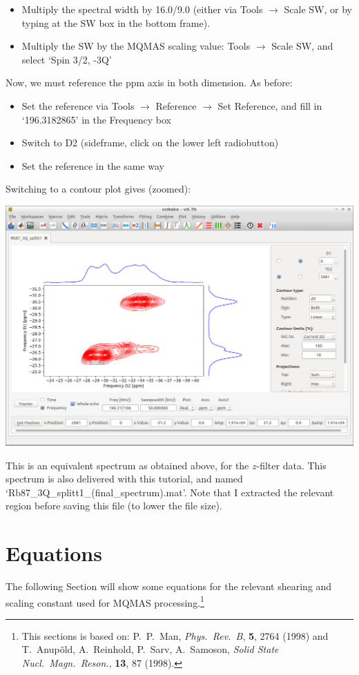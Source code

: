 \documentclass[11pt,a4paper]{article}
\begin{document}
\begin{itemize}
	\item Multiply the spectral width by 16.0/9.0 (either via Tools  $\longrightarrow$ Scale SW, or
	  by typing at the SW box in the bottom frame).
	\item Multiply the SW by the MQMAS scaling value: Tools  $\longrightarrow$ Scale SW, and select `Spin 3/2, -3Q'
\end{itemize}
Now, we must reference the ppm axis in both dimension. As before:
\begin{itemize}
  \item Set the reference via Tools $\longrightarrow$ Reference $\longrightarrow$ Set Reference, and
	 fill in `196.3182865' in the Frequency box
	\item Switch to D2 (sideframe, click on the lower left radiobutton)
	\item Set the reference in the same way
\end{itemize}
Switching to a contour plot gives (zoomed):
\begin{center}
\includegraphics[width=0.8\linewidth]{Figs/Fig11.png}
\end{center}
This is an equivalent spectrum as obtained above, for the $z$-filter data.
This spectrum is also delivered with this tutorial, and named `Rb87\_3Q\_splitt1\_(final\_spectrum).mat'.
Note that I extracted the relevant region before saving this file (to lower the file size).


\section{Equations}
The following Section will show some equations for the relevant shearing and scaling constant used
for MQMAS processing.\footnote{This sections is based on:
  P.\ P.\ Man, \textit{Phys.\ Rev.\ B}, \textbf{5}, 2764 (1998) and 
  T.\ Anup\~{o}ld, A.\ Reinhold, P.\ Sarv, A.\ Samoson, \textit{Solid State Nucl.\ Magn.\ Reson.},
  \textbf{13}, 87 (1998).
  }
\end{document}
